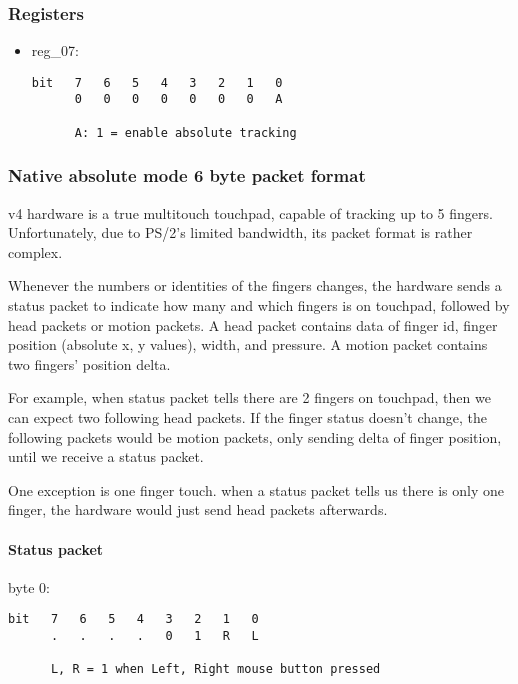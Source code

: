 \documentclass[a4paper,8pt,english]{sphinxmanual}
\begin{document}
\subsubsection{Registers}
\label{input/devices/elantech:id6}\begin{itemize}
\item {} 
reg\_07:

\begin{Verbatim}[commandchars=\\\{\}]
bit   7   6   5   4   3   2   1   0
      0   0   0   0   0   0   0   A

      A: 1 = enable absolute tracking
\end{Verbatim}

\end{itemize}


\subsubsection{Native absolute mode 6 byte packet format}
\label{input/devices/elantech:id7}
v4 hardware is a true multitouch touchpad, capable of tracking up to 5 fingers.
Unfortunately, due to PS/2's limited bandwidth, its packet format is rather
complex.

Whenever the numbers or identities of the fingers changes, the hardware sends a
status packet to indicate how many and which fingers is on touchpad, followed by
head packets or motion packets. A head packet contains data of finger id, finger
position (absolute x, y values), width, and pressure. A motion packet contains
two fingers' position delta.

For example, when status packet tells there are 2 fingers on touchpad, then we
can expect two following head packets. If the finger status doesn't change,
the following packets would be motion packets, only sending delta of finger
position, until we receive a status packet.

One exception is one finger touch. when a status packet tells us there is only
one finger, the hardware would just send head packets afterwards.


\paragraph{Status packet}
\label{input/devices/elantech:status-packet}
byte 0:

\begin{Verbatim}[commandchars=\\\{\}]
bit   7   6   5   4   3   2   1   0
      .   .   .   .   0   1   R   L

      L, R = 1 when Left, Right mouse button pressed
\end{Verbatim}
\end{document}
